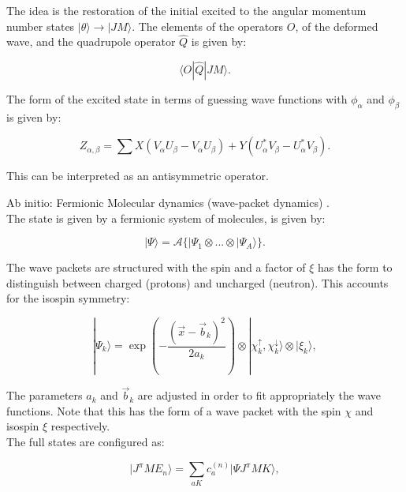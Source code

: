 \documentclass[openany]{book}
\begin{document}
The idea is the restoration of the initial excited to the angular momentum number states $|\theta \rangle \rightarrow | JM \rangle$. The elements of the operators $O$, of the deformed wave, and the quadrupole operator $\hat Q$ is given by: 

\begin{equation}\label{eq:micro_QHFB_quadrupole}
	\langle  O | \hat Q|  JM \rangle. 
\end{equation}

The form of the excited state in terms of guessing wave functions with $\phi_\alpha$ and $\phi_\beta$ is given by:

\begin{equation}\label{eq:micro_QHFB_densityGround}
	Z_{\alpha, \beta} = \sum {X (V_\alpha U_\beta - V_\alpha U_\beta) + Y (U^{*}_\alpha V_\beta - U^{*}_\alpha V_\beta)}. 
\end{equation}

This can be interpreted as an antisymmetric operator. 

Ab initio: Fermionic Molecular dynamics (wave-packet dynamics) \cite{neff_feldmeier_langanke_2011}. \\

The state is given by a fermionic system of molecules, is given by: 

\begin{equation}\label{eq:micro_FMD_state}
	| \Psi \rangle = \mathcal{A} \{ |\Psi_1 \otimes ... \otimes |\Psi_A \rangle \}.
\end{equation}

The wave packets are structured with the spin and a factor of $\xi$ has the form to distinguish between charged (protons) and uncharged (neutron). This accounts for the isospin symmetry:

\begin{equation} \label{eq:micro_FMD_wavePacket}
	|\Psi_k \rangle = \exp {\left ( - \frac{(\vec x - \vec b_k)^2}{2a_k} \right)} \otimes |\chi^{\uparrow}_k,  \chi^{\downarrow}_k \rangle \otimes |\xi_k \rangle, 
\end{equation}

The parameters $a_k$ and $\vec b_k$ are adjusted in order to fit appropriately the wave functions. Note that this has the form of a wave packet with the spin  $\chi$ and isospin  $\xi$ respectively. \\


The full states are configured as: 

\begin{equation} \label{eq:micro_FMD_generalState}
	| J^{\pi} M E_n \rangle = \sum_{aK}{c^{(n)}_a | \Psi J^\pi MK \rangle} , 
\end{equation}
\end{document}

